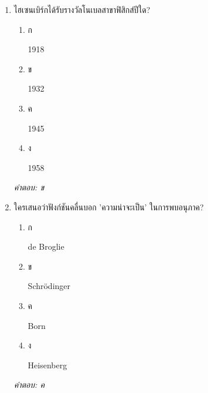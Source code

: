 \documentclass[12pt]{article}
\begin{document}
\begin{enumerate}[label=\arabic*., itemsep=0.5\baselineskip, topsep=0.5\baselineskip, leftmargin=*]
\item ไฮเซนเบิร์กได้รับรางวัลโนเบลสาขาฟิสิกส์ปีใด?
\begin{enumerate}[label=\alph*)., itemsep=0.3\baselineskip, topsep=0.3\baselineskip]
\item ก\ 
\begin{minipage}[t]{0.9\linewidth}
\raggedright 1918
\end{minipage}
\item ข\ 
\begin{minipage}[t]{0.9\linewidth}
\raggedright 1932
\end{minipage}
\item ค\ 
\begin{minipage}[t]{0.9\linewidth}
\raggedright 1945
\end{minipage}
\item ง\ 
\begin{minipage}[t]{0.9\linewidth}
\raggedright 1958
\end{minipage}
\end{enumerate}
\vspace{-0.3\baselineskip}
\begin{small}
\textit{คำตอบ: ข}
\end{small}

\item ใครเสนอว่าฟังก์ชันคลื่นบอก 'ความน่าจะเป็น' ในการพบอนุภาค?
\begin{enumerate}[label=\alph*)., itemsep=0.3\baselineskip, topsep=0.3\baselineskip]
\item ก\ 
\begin{minipage}[t]{0.9\linewidth}
\raggedright de Broglie
\end{minipage}
\item ข\ 
\begin{minipage}[t]{0.9\linewidth}
\raggedright Schrödinger
\end{minipage}
\item ค\ 
\begin{minipage}[t]{0.9\linewidth}
\raggedright Born
\end{minipage}
\item ง\ 
\begin{minipage}[t]{0.9\linewidth}
\raggedright Heisenberg
\end{minipage}
\end{enumerate}
\vspace{-0.3\baselineskip}
\begin{small}
\textit{คำตอบ: ค}
\end{small}


\end{enumerate}
\end{document}
